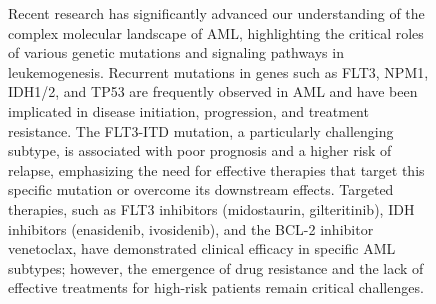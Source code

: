 \begin{figure}[htbp!]
\begin{tcolorbox}[
    colback=black!5!white,
    colframe=black!60!white,
    title=\textbf{KIRA6 for AML},
    fonttitle=\bfseries,
    arc=3mm,
    boxrule=1pt,
    bottomrule=2pt,
]
Recent research has significantly advanced our understanding of the complex molecular landscape of AML, highlighting the critical roles of various genetic mutations and signaling pathways in leukemogenesis. Recurrent mutations in genes such as FLT3, NPM1, IDH1/2, and TP53 are frequently observed in AML and have been implicated in disease initiation, progression, and treatment resistance. The FLT3-ITD mutation, a particularly challenging subtype, is associated with poor prognosis and a higher risk of relapse, emphasizing the need for effective therapies that target this specific mutation or overcome its downstream effects. Targeted therapies, such as FLT3 inhibitors (midostaurin, gilteritinib), IDH inhibitors (enasidenib, ivosidenib), and the BCL-2 inhibitor venetoclax, have demonstrated clinical efficacy in specific AML subtypes; however, the emergence of drug resistance and the lack of effective treatments for high-risk patients remain critical challenges. \\


\end{tcolorbox}
\end{figure}

